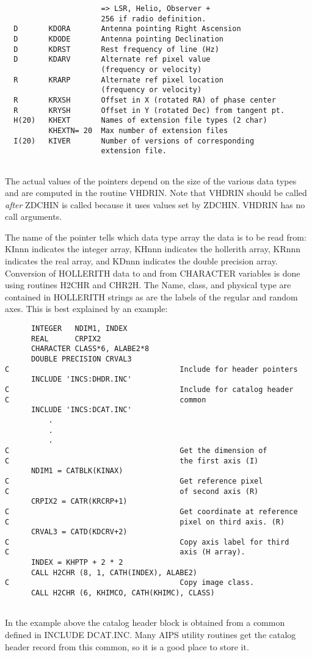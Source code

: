 \begin{verbatim}
                      => LSR, Helio, Observer +
                      256 if radio definition.
  D       KDORA       Antenna pointing Right Ascension
  D       KDODE       Antenna pointing Declination
  D       KDRST       Rest frequency of line (Hz)
  D       KDARV       Alternate ref pixel value
                      (frequency or velocity)
  R       KRARP       Alternate ref pixel location
                      (frequency or velocity)
  R       KRXSH       Offset in X (rotated RA) of phase center
  R       KRYSH       Offset in Y (rotated Dec) from tangent pt.
  H(20)   KHEXT       Names of extension file types (2 char)
          KHEXTN= 20  Max number of extension files
  I(20)   KIVER       Number of versions of corresponding
                      extension file.


\end{verbatim}
The actual values of the pointers depend on the size of the various
data types and are computed in the routine VHDRIN.  Note that VHDRIN
should be called {\it after}  ZDCHIN is called because it uses values
set by ZDCHIN.  VHDRIN has no call arguments.

The name of the pointer tells which data type array the data is to be
read from: KInnn indicates the integer array, KHnnn indicates the
hollerith array, KRnnn indicates the real array, and KDnnn indicates
the double precision array.  Conversion of HOLLERITH data to and from
CHARACTER variables is done using routines H2CHR and CHR2H.  The Name,
class, and physical type are contained in HOLLERITH strings as are the
labels of the regular and random axes. This is best explained by an
example:

\begin{verbatim}
      INTEGER   NDIM1, INDEX
      REAL      CRPIX2
      CHARACTER CLASS*6, ALABE2*8
      DOUBLE PRECISION CRVAL3
C                                       Include for header pointers
      INCLUDE 'INCS:DHDR.INC'
C                                       Include for catalog header
C                                       common
      INCLUDE 'INCS:DCAT.INC'
          .
          .
          .
C                                       Get the dimension of
C                                       the first axis (I)
      NDIM1 = CATBLK(KINAX)
C                                       Get reference pixel
C                                       of second axis (R)
      CRPIX2 = CATR(KRCRP+1)
C                                       Get coordinate at reference
C                                       pixel on third axis. (R)
      CRVAL3 = CATD(KDCRV+2)
C                                       Copy axis label for third
C                                       axis (H array).
      INDEX = KHPTP + 2 * 2
      CALL H2CHR (8, 1, CATH(INDEX), ALABE2)
C                                       Copy image class.
      CALL H2CHR (6, KHIMCO, CATH(KHIMC), CLASS)


\end{verbatim}
In the example above the catalog header block is obtained from a
common defined in INCLUDE DCAT.INC.  Many AIPS utility routines get
the catalog header record from this common, so it is a good place to
store it.

